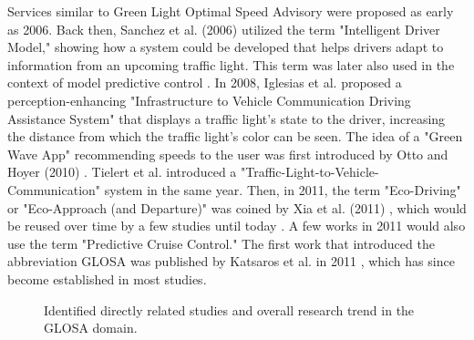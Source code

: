 Services similar to Green Light Optimal Speed Advisory were proposed as early as 2006. Back then, Sanchez et al. (2006) \cite{sanchez_predicting_2006} utilized the term "Intelligent Driver Model," showing how a system could be developed that helps drivers adapt to information from an upcoming traffic light. This term was later also used in the context of model predictive control \cite{xin_predictive_2018}. In 2008, Iglesias et al. \cite{iglesias_i2v_2008} proposed a perception-enhancing "Infrastructure to Vehicle Communication Driving Assistance System" that displays a traffic light's state to the driver, increasing the distance from which the traffic light's color can be seen. The idea of a "Green Wave App" recommending speeds to the user was first introduced by Otto and Hoyer (2010) \cite{otto_operating_2010}. Tielert et al. \cite{tielert_impact_2010} introduced a "Traffic-Light-to-Vehicle-Communication" system in the same year. Then, in 2011, the term "Eco-Driving" or "Eco-Approach (and Departure)" was coined by Xia et al. (2011) \cite{xia_indirect_2011}, which would be reused over time by a few studies until today \cite{rakha_eco-driving_2011, rakha_aeris_2012, xia_field_2012, hao_eco-approach_2019, hu_lane-level_2023}. A few works in 2011 \cite{asadi_predictive_2011, raubitschek_predictive_2011} would also use the term "Predictive Cruise Control." The first work that introduced the abbreviation GLOSA was published by Katsaros et al. in 2011 \cite{katsaros_performance_2011}, which has since become established in most studies.

\begin{figure}[t]
\centering
{}
\caption{Identified directly related studies and overall research trend in the GLOSA domain.}
\label{fig:related-work-research-method}
\end{figure}

